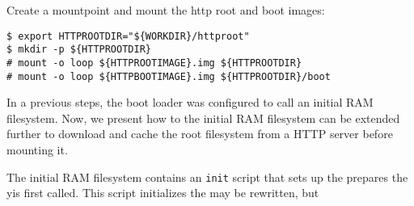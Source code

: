 Create a mountpoint and mount the http root and boot images:
\begin{lstlisting}[]
$ export HTTPROOTDIR="${WORKDIR}/httproot"
$ mkdir -p ${HTTPROOTDIR}
# mount -o loop ${HTTPROOTIMAGE}.img ${HTTPROOTDIR}
# mount -o loop ${HTTPBOOTIMAGE}.img ${HTTPROOTDIR}/boot
\end{lstlisting}
\FloatBarrier
\vspace{-5mm}

In a previous steps, the boot loader was configured to call an initial \ac{RAM}
filesystem. Now, we present how to the initial \ac{RAM}
filesystem can be extended further to download and cache the root filesystem
from a \ac{HTTP} server before mounting it.

The initial \ac{RAM} filesystem contains an \texttt{init} script that
sets up the prepares the yis first
called. This script initializes the  may be rewritten, but


